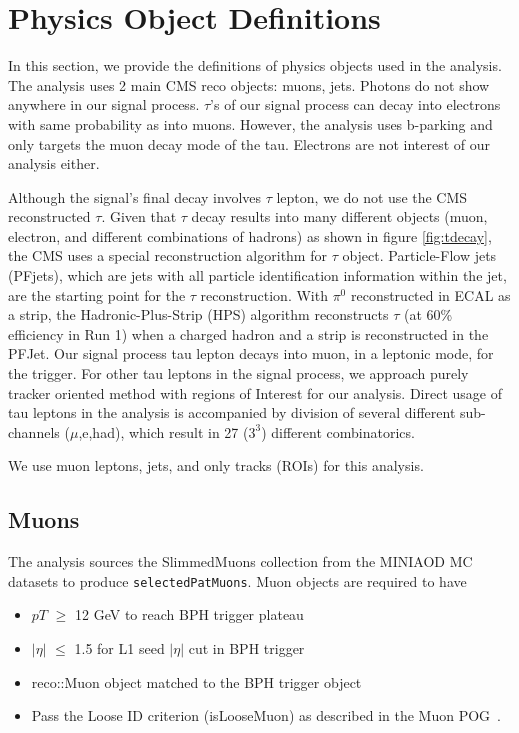 \clearpage
\chapter{Physics Object Definitions}\label{sec:objects}

In this section, we provide the definitions of physics objects used in the analysis.
The analysis uses 2 main CMS reco objects: muons, jets.
Photons do not show anywhere in our signal process.
$\tau$'s of our signal process can decay into electrons with same probability as into muons. 
However, the analysis uses b-parking and only targets the muon decay mode of the tau.
Electrons are not interest of our analysis either.

Although the signal's final decay involves $\tau$ lepton, we do not use the CMS reconstructed $\tau$.
Given that $\tau$ decay results into many different objects (muon, electron, and different combinations of hadrons) as shown in figure \ref{fig:tdecay}, the CMS uses a special reconstruction algorithm for $\tau$ object.
Particle-Flow jets (PFjets), which are jets with all particle identification information within the jet, are the starting point for the $\tau$ reconstruction.
With $\pi^{0}$ reconstructed in ECAL as a strip, the Hadronic-Plus-Strip (HPS) algorithm reconstructs $\tau$ (at 60\% efficiency in Run 1) when a charged hadron and a strip is reconstructed in the PFJet\cite{HPS}.
Our signal process tau lepton decays into muon, in a leptonic mode, for the trigger.
For other tau leptons in the signal process, we approach purely tracker oriented method with regions of Interest for our analysis.
Direct usage of tau leptons in the analysis is accompanied by division of several different sub-channels ($\mu$,e,had), which result in 27 ($3^{3}$) different combinatorics. 

We use muon leptons, jets, and only tracks (ROIs) for this analysis.
\section{Muons}\label{sec:muons}
The analysis sources the SlimmedMuons collection from the MINIAOD MC datasets to produce {\tt selectedPatMuons}.
Muon objects are required to have 
\begin{itemize}
  \item $pT$ $\geq$ 12 GeV to reach BPH trigger plateau
  \item $|\eta|$ $\leq$ 1.5 for L1 seed $|\eta|$ cut in BPH trigger
  \item reco::Muon object matched to the BPH trigger object
  \item Pass the Loose ID criterion (isLooseMuon) as described in the Muon POG~\cite{muonpog}.
\end{itemize}

